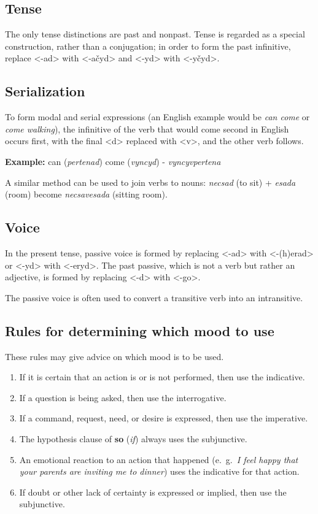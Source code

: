 \documentclass{book}
\begin{document}
\subsection{Tense}

The only tense distinctions are past and nonpast. Tense is regarded as a special construction, rather than a conjugation; in order to form the past infinitive, replace <-ad> with <-ačyd> and <-yd> with <-yčyd>.

\subsection{Serialization}

\label{subsec:serialization}

To form modal and serial expressions (an English example would be \emph{can come} or \emph{come walking}), the infinitive of the verb that would come second in English occurs first, with the final <d> replaced with <v>, and the other verb follows.

\textbf{Example:} can (\emph{pertenad}) come (\emph{vyncyd}) - \emph{vyncyvpertena}

A similar method can be used to join verbs to nouns: \emph{necsad} (to sit) + \emph{esada} (room) become \emph{necsavesada} (sitting room).

\subsection{Voice}

In the present tense, passive voice is formed by replacing <-ad> with <-(h)erad> or <-yd> with <-eryd>. The past passive, which is not a verb but rather an adjective, is formed by replacing <-d> with <-go>.

The passive voice is often used to convert a transitive verb into an intransitive.

\subsection{Rules for determining which mood to use}

These rules may give advice on which mood is to be used.

\begin{enumerate}
  \item If it is certain that an action is or is not performed, then use the indicative.
  \item If a question is being asked, then use the interrogative.
  \item If a command, request, need, or desire is expressed, then use the imperative.
  \item The hypothesis clause of \textbf{so} (\emph{if}) always uses the subjunctive.
  \item An emotional reaction to an action that happened (e.~g.~\emph{I feel happy that your parents are inviting me to dinner}) uses the indicative for that action.
  \item If doubt or other lack of certainty is expressed or implied, then use the subjunctive.
\end{enumerate}
\end{document}
